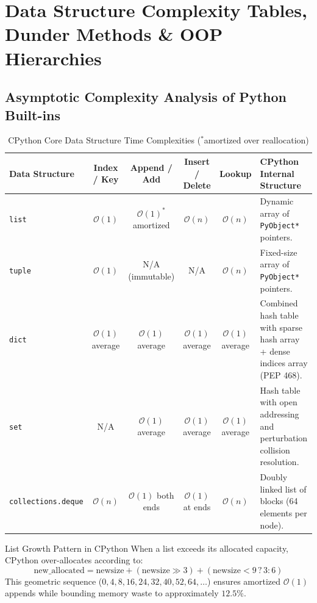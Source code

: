 \chapter{Data Structure Complexity Tables, Dunder Methods \& OOP Hierarchies}
\label{chap:data-structures-oop}

\section{Asymptotic Complexity Analysis of Python Built-ins}
\begin{table}[htbp]
\centering
\small
\begin{tabularx}{\linewidth}{lccccX}
\toprule
\textbf{Data Structure} & \textbf{Index / Key} & \textbf{Append / Add} & \textbf{Insert / Delete} & \textbf{Lookup} & \textbf{CPython Internal Structure} \\
\midrule
\texttt{list} & $\mathcal{O}(1)$ & $\mathcal{O}(1)^*$ amortized & $\mathcal{O}(n)$ & $\mathcal{O}(n)$ & Dynamic array of \texttt{PyObject*} pointers. \\
\texttt{tuple} & $\mathcal{O}(1)$ & N/A (immutable) & N/A & $\mathcal{O}(n)$ & Fixed-size array of \texttt{PyObject*} pointers. \\
\texttt{dict} & $\mathcal{O}(1)$ average & $\mathcal{O}(1)$ average & $\mathcal{O}(1)$ average & $\mathcal{O}(1)$ average & Combined hash table with sparse hash array + dense indices array (PEP 468). \\
\texttt{set} & N/A & $\mathcal{O}(1)$ average & $\mathcal{O}(1)$ average & $\mathcal{O}(1)$ average & Hash table with open addressing and perturbation collision resolution. \\
\texttt{collections.deque} & $\mathcal{O}(n)$ & $\mathcal{O}(1)$ both ends & $\mathcal{O}(1)$ at ends & $\mathcal{O}(n)$ & Doubly linked list of blocks (64 elements per node). \\
\bottomrule
\end{tabularx}
\caption{CPython Core Data Structure Time Complexities ($^*$amortized over reallocation)}
\end{table}

\begin{formulabox}{List Growth Pattern in CPython}
When a list exceeds its allocated capacity, CPython over-allocates according to:
\begin{equation}
\text{new\_allocated} = \text{newsize} + (\text{newsize} \gg 3) + (\text{newsize} < 9 \mathrel{?} 3 : 6)
\end{equation}
This geometric sequence ($0, 4, 8, 16, 24, 32, 40, 52, 64, \dots$) ensures amortized $\mathcal{O}(1)$ appends while bounding memory waste to approximately $12.5\%$.
\end{formulabox}

